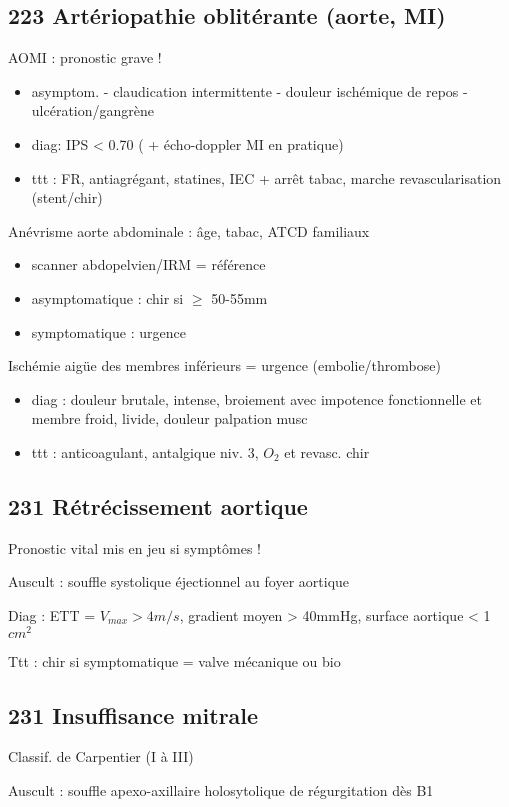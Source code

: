 \documentclass[11pt]{article}
\begin{document}
\subsection{223 Artériopathie oblitérante (aorte, MI)}
\label{sec:org31627a2}
AOMI : pronostic grave !
\begin{itemize}
\item asymptom. - claudication intermittente - douleur ischémique de repos -
ulcération/gangrène
\item diag: IPS < 0.70 ( + écho-doppler MI en pratique)
\item ttt : FR, antiagrégant, statines, IEC + arrêt tabac, marche \textpm{}
revascularisation (stent/chir)
\end{itemize}
Anévrisme aorte abdominale : âge, tabac, ATCD familiaux
\begin{itemize}
\item scanner abdopelvien/IRM = référence
\item asymptomatique : chir si \diameter \(\ge\) 50-55mm
\item symptomatique : urgence
\end{itemize}
Ischémie aigüe des membres inférieurs = urgence  (embolie/thrombose)
\begin{itemize}
\item diag : douleur brutale, intense, broiement avec impotence fonctionnelle et membre froid, livide, douleur palpation musc
\item ttt : anticoagulant, antalgique niv. 3, \(O_2\) et revasc. chir
\end{itemize}

\subsection{231 Rétrécissement aortique}
\label{sec:org3fcf757}
Pronostic vital mis en jeu si symptômes !

Auscult : souffle systolique éjectionnel au foyer aortique

Diag : ETT = \(V_{max} > 4m/s\), gradient moyen > 40mmHg, surface aortique <
1\(cm^2\)

Ttt : chir si symptomatique = valve mécanique ou bio
\subsection{231 Insuffisance mitrale}
\label{sec:org0a43992}
Classif. de Carpentier (I à III)

Auscult : souffle apexo-axillaire holosytolique de régurgitation dès B1
\end{document}
